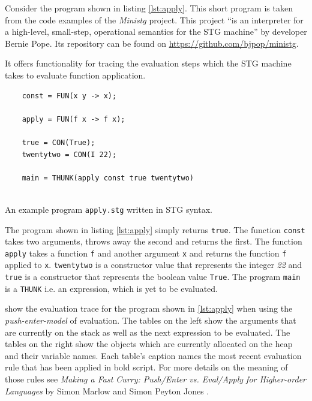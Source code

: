 \documentclass[runningheads]{llncs}
\begin{document}
Consider the program shown in listing \ref{lst:apply}. This short program is taken from the code examples of the \textit{Ministg} project. This project \enquote{is an interpreter for a high-level, small-step, operational semantics for the STG machine} by developer Bernie Pope. Its repository can be found on \url{https://github.com/bjpop/ministg}.

It offers functionality for tracing the evaluation steps which the STG machine takes to evaluate function application.

\begin{listing}[H]
	\begin{verbatim}
	const = FUN(x y -> x);
	
	apply = FUN(f x -> f x);
	
	true = CON(True);
	twentytwo = CON(I 22);
	
	main = THUNK(apply const true twentytwo)
	
	\end{verbatim}
	\caption{An example program \texttt{apply.stg} written in STG syntax.}
	\label{lst:apply}
\end{listing}

The program shown in listing \ref{lst:apply} simply returns \texttt{true}. The function \texttt{const} takes two arguments, throws away the second and returns the first. The function \texttt{apply} takes a function \texttt{f} and another argument \texttt{x} and returns the function \texttt{f} applied to \texttt{x}. \texttt{twentytwo} is a constructor value that represents the integer \textit{22} and \texttt{true} is a constructor that represents the boolean value \texttt{True}. The program \texttt{main} is a \texttt{THUNK} i.e. an expression, which is yet to be evaluated.



 show the evaluation trace for the program shown in \cref{lst:apply} when using the \textit{push-enter-model} of evaluation.
The tables on the left show the arguments that are currently on the stack as well as the next expression to be evaluated. The tables on the right show the objects which are currently allocated on the heap and their variable names. Each table's caption names the most recent evaluation rule that has been applied in bold script. For more details on the meaning of those rules see \textit{Making a Fast Curry: Push/Enter vs. Eval/Apply for Higher-order Languages} by Simon Marlow and Simon Peyton Jones \cite{marlow2004making}.
\end{document}
